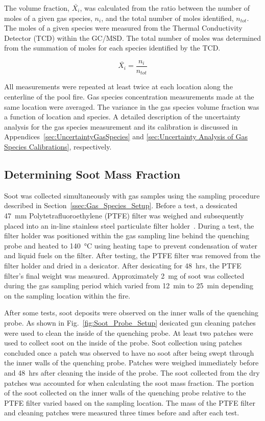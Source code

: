 \documentclass[12pt]{article}
\begin{document}
The volume fraction, $\bar{X_{i}}$, was calculated from the ratio between the number of moles of a given gas species, $n_{i}$, and the total number of moles identified, $n_{tot}$. The moles of a given species were measured from the Thermal Conductivity Detector (TCD) within the GC/MSD. The total number of moles was determined from the summation of moles for each species identified by the TCD.

\begin{equation}\label{eq:volume_fraction}
  \bar{X_{i}}= \frac{n_{i}}{n_{tot}}
\end{equation}

All measurements were repeated at least twice at each location along the centerline of the pool fire. Gas species concentration measurements made at the same location were averaged. The variance in the gas species volume fraction was a function of location and species. A detailed description of the uncertainty analysis for the gas species measurement and its calibration is discussed in Appendices~\ref{sec:UncertaintyGasSpecies} and \ref{sec:Uncertainty Analysis of Gas Species Calibrations}, respectively.

\subsection{Determining Soot Mass Fraction}
\label{ssec:Soot_Setup}

Soot was collected simultaneously with gas samples using the sampling procedure described in Section~\ref{ssec:Gas_Species_Setup}. Before a test, a dessicated 47~\si{mm} Polytetrafluoroethylene (PTFE) filter was weighed and subsequently placed into an in-line stainless steel particulate filter holder~\cite{GelmanSciences1235}. During a test, the filter holder was positioned within the gas sampling line behind the quenching probe and heated to 140~°\si{C} using heating tape to prevent condensation of water and liquid fuels on the filter. After testing, the PTFE filter was removed from the filter holder and dried in a desicator. After desicating for 48~\si{hrs}, the PTFE filter's final weight was measured. Approximately 2~\si{mg} of soot was collected during the gas sampling period which varied from 12~\si{min} to 25~\si{min} depending on the sampling location within the fire.

After some tests, soot deposits were observed on the inner walls of the quenching probe. As shown in Fig.~\ref{fig:Soot_Probe_Setup} desicated gun cleaning patches were used to clean the inside of the quenching probe. At least two patches were used to collect soot on the inside of the probe. Soot collection using patches concluded once a patch was observed to have no soot after being swept through the inner walls of the quenching probe. Patches were weighed immediately before and 48~\si{hrs} after cleaning the inside of the probe. The soot collected from the dry patches was accounted for when calculating the soot mass fraction. The portion of the soot collected on the inner walls of the quenching probe relative to the PTFE filter varied based on the sampling location. The mass of the PTFE filter and cleaning patches were measured three times before and after each test.
\end{document}
